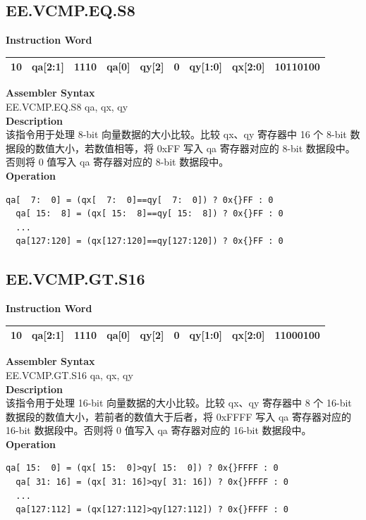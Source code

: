 \clearpage
\subsection{EE.VCMP.EQ.S8}\label{instruction:EEVCMPEQS8}
\setlength\tabcolsep{6pt}
\textbf{Instruction Word} \\
\begin{tabular}{|c|c|c|c|c|c|c|c|c|}
	\hline
	10 & qa[2:1] & 1110 & qa[0] & qy[2] & 0 & qy[1:0] & qx[2:0] & 10110100 \\
	\hline
\end{tabular}

\textbf{Assembler Syntax} \\
EE.VCMP.EQ.S8 qa, qx, qy \\
\textbf{Description} \\
该指令用于处理 8-bit 向量数据的大小比较。比较 qx、qy 寄存器中 16 个 8-bit 数据段的数值大小，若数值相等，将 0x{}FF 写入 qa 寄存器对应的 8-bit 数据段中。否则将 0 值写入 qa 寄存器对应的 8-bit 数据段中。\\
\textbf{Operation}
\begin{lstlisting}[escapeinside=`?]
  qa[  7:  0] = (qx[  7:  0]==qy[  7:  0]) ? 0x{}FF : 0
  qa[ 15:  8] = (qx[ 15:  8]==qy[ 15:  8]) ? 0x{}FF : 0
  ...
  qa[127:120] = (qx[127:120]==qy[127:120]) ? 0x{}FF : 0
\end{lstlisting}

\clearpage
\subsection{EE.VCMP.GT.S16}\label{instruction:EEVCMPGTS16}
\setlength\tabcolsep{6pt}
\textbf{Instruction Word} \\
\begin{tabular}{|c|c|c|c|c|c|c|c|c|}
	\hline
	10 & qa[2:1] & 1110 & qa[0] & qy[2] & 0 & qy[1:0] & qx[2:0] & 11000100 \\
	\hline
\end{tabular}

\textbf{Assembler Syntax} \\
EE.VCMP.GT.S16 qa, qx, qy \\
\textbf{Description} \\
该指令用于处理 16-bit 向量数据的大小比较。比较 qx、qy 寄存器中 8 个 16-bit 数据段的数值大小，若前者的数值大于后者，将 0x{}FFFF 写入 qa 寄存器对应的 16-bit 数据段中。否则将 0 值写入 qa 寄存器对应的 16-bit 数据段中。\\
\textbf{Operation}
\begin{lstlisting}[escapeinside=`?]
  qa[ 15:  0] = (qx[ 15:  0]>qy[ 15:  0]) ? 0x{}FFFF : 0
  qa[ 31: 16] = (qx[ 31: 16]>qy[ 31: 16]) ? 0x{}FFFF : 0
  ...
  qa[127:112] = (qx[127:112]>qy[127:112]) ? 0x{}FFFF : 0
\end{lstlisting}

